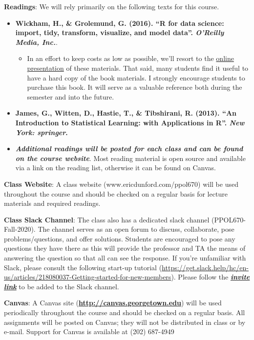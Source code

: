 \documentclass[
  12pt,
]{article}
\providecommand{\tightlist}{%
  \setlength{\itemsep}{0pt}\setlength{\parskip}{0pt}}
\begin{document}
\textbf{Readings}: We will rely primarily on the following texts for
this course.

\begin{itemize}
\item
  \textbf{Wickham, H., \& Grolemund, G. (2016). ``R for data science:
  import, tidy, transform, visualize, and model data''. \emph{O'Reilly
  Media, Inc.}}.

  \begin{itemize}
  \tightlist
  \item
    In an effort to keep costs as low as possible, we'll resort to the
    \href{https://r4ds.had.co.nz/}{online presentation} of these
    materials. That said, many students find it useful to have a hard
    copy of the book materials. I strongly encourage students to
    purchase this book. It will serve as a valuable reference both
    during the semester and into the future.
  \end{itemize}
\item
  \textbf{James, G., Witten, D., Hastie, T., \& Tibshirani, R. (2013).
  ``An Introduction to Statistical Learning: with Applications in R''.
  \emph{New York: springer}.}
\item
  \textbf{\emph{Additional readings will be posted for each class and
  can be found on the course website}}. Most reading material is open
  source and available via a link on the reading list, otherwise it can
  be found on Canvas.
\end{itemize}

\textbf{Class Website}: A class website (www.ericdunford.com/ppol670)
will be used throughout the course and should be checked on a regular
basis for lecture materials and required readings.

\textbf{Class Slack Channel}: The class also has a dedicated slack
channel (PPOL670-Fall-2020). The channel serves as an open forum to
discuss, collaborate, pose problems/questions, and offer solutions.
Students are encouraged to pose any questions they have there as this
will provide the professor and TA the means of answering the question so
that all can see the response. If you're unfamiliar with Slack, please
consult the following start-up tutorial
(\url{https://get.slack.help/hc/en-us/articles/218080037-Getting-started-for-new-members}).
Please follow the
\href{https://join.slack.com/t/ppol670-fall-2020/shared_invite/zt-gnbnemyd-9GSNAaEfXtSUgzsnH3KHKA}{\textbf{\emph{invite
link}}} to be added to the Slack channel.

\textbf{Canvas}: A Canvas site
(\textbf{\url{http://canvas.georgetown.edu}}) will be used periodically
throughout the course and should be checked on a regular basis. All
assignments will be posted on Canvas; they will not be distributed in
class or by e-mail. Support for Canvas is available at (202) 687-4949
\end{document}
